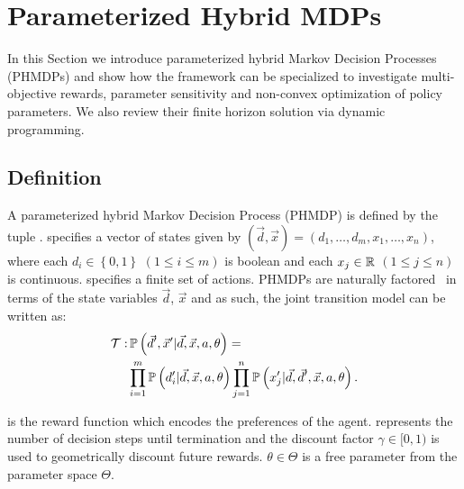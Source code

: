 \section{Parameterized Hybrid MDPs}
\label{sec:hybrid_mdps}

In this Section we introduce parameterized hybrid Markov Decision Processes (PHMDPs) and show how the framework can be specialized to investigate multi-objective rewards, parameter sensitivity and non-convex optimization of policy parameters. We also review their finite horizon solution via dynamic programming.

\subsection{Definition}
\label{sec:hybrid_mdps_def}

A parameterized hybrid Markov Decision Process (PHMDP) is defined by the tuple {\footnotesize \PMDPTuple}. {\footnotesize \State} specifies a vector of states given by {\footnotesize $(\vec{d}, \vec{x}) = \left( d_1, \ldots, d_m, x_1, \ldots, x_n \right) $}, where each {\footnotesize $ d_i \in \left\lbrace 0, 1 \right\rbrace $} {\footnotesize $\left( 1 \leq i \leq m \right)$} is boolean and each {\footnotesize$ x_j \in \mathbb{R} $} {\footnotesize $\left( 1 \leq j \leq n \right)$} is continuous. {\footnotesize \Action} specifies a finite set of actions. PHMDPs
are naturally factored~\parencite{Boutilier_JAIR_1999} in terms of the state variables {\footnotesize$\vec{d}$, $\vec{x}$} and as such, the joint transition model can be written as:
{\footnotesize
\abovedisplayskip=0pt
\belowdisplayskip=0pt
\begin{align}
    \label{eq:hmdp_tfunc}
    \mathcal{T} :& \, \mathbb{P}\left({\vec{d}', \vec{x}' | \vec{d}, \vec{x}, a, \theta}\right) = \nonumber \\
    & \prod_{i=1}^{m} \mathbb{P}\left({d_i' | \vec{d}, \vec{x}, a, \theta}\right) \prod_{j=1}^{n} \mathbb{P}\left({x_j' | \vec{d}, \vec{d}', \vec{x}, a, \theta}\right).
\end{align}   
}

{\footnotesize \RewardFunc} is the reward function which encodes the preferences of the agent. {\footnotesize \Horizon} represents the number of decision steps until termination and the discount factor {\footnotesize $\gamma \in [0, 1)$} is used to geometrically discount future rewards. {\footnotesize $\theta \in \Theta$} is a free parameter from the parameter space {\footnotesize $ \Theta $}.

